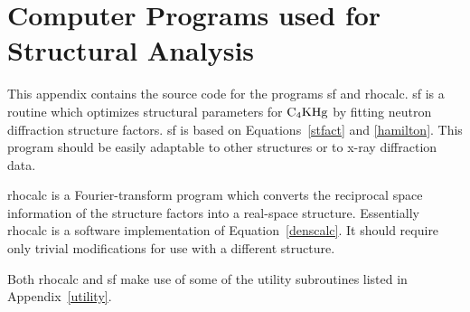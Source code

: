 \chapter{Computer Programs used for Structural Analysis}
\label{structprog}
\pagestyle{headings}

        This  appendix contains the source code  for  the programs  sf  and
rhocalc.  sf is  a  routine which optimizes structural  parameters for $\rm
C_4KHg$ by fitting  neutron diffraction structure factors.  sf  is based on
Equations~\ref{stfact}  and \ref{hamilton}.  This  program should be easily
adaptable to other structures or to x-ray diffraction data.

        rhocalc   is   a Fourier-transform  program   which   converts  the
reciprocal space  information of  the structure  factors  into a real-space
structure.   Essentially   rhocalc  is   a   software  implementation    of
Equation~\ref{denscalc}.  It should require only  trivial modifications for
use with a different structure.

        Both rhocalc and sf make use of some of the utility subroutines
listed in Appendix~\ref{utility}.

